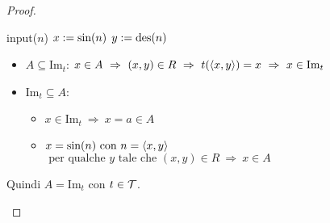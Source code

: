 \begin{proof}
\begin{itemize}
\begin{itemize}
                \begin{minipage}{.32\textwidth}
                    \begin{tcolorbox}[
                        colback=white,
                        sharp corners,
                        boxrule=.3mm,
                        left=20pt,
                        top=0pt,
                        bottom=0pt
                    ]
                    \begin{algorithm}[H]
                        \SetAlgoNoEnd
                        input($n$)\;
                        $x:=\text{sin}(n)$\;
                        $y:=\text{des}(n)$\;
                    \end{algorithm}
                    \end{tcolorbox}
                \end{minipage}\hspace{1em}
                \begin{minipage}{.50\textwidth}
                    \begin{itemize}
                        \setlength\itemsep{1em}
                        \item[\textminus] $A\subseteq\text{Im}_t$: $x\in A \
                        \Rightarrow \ (x,y)\in R\ \Rightarrow \ t(\cantor{x,y})=x\ 
                        \Rightarrow \ x\in\text{Im}_t$
                        \item[\textminus] $\text{Im}_t\subseteq A$:
                        \begin{itemize}\setlength\itemsep{.4em}
                            \item $x\in \text{Im}_t \ \Rightarrow \ x=a\in A$
                            \item $x=\text{sin}(n)\text{ con }n=\langle x,y\rangle$\\
                                $\text{ per qualche $y$ tale che }(x,y)\in R
                                \ \Rightarrow\ x\in A$
                        \end{itemize}
                    \end{itemize}
                \end{minipage}\vspace{1em}
            \end{itemize}
            Quindi $A=\text{Im}_t$ con $t\in\mathcal{T}$.
    \end{itemize}
\end{proof}
